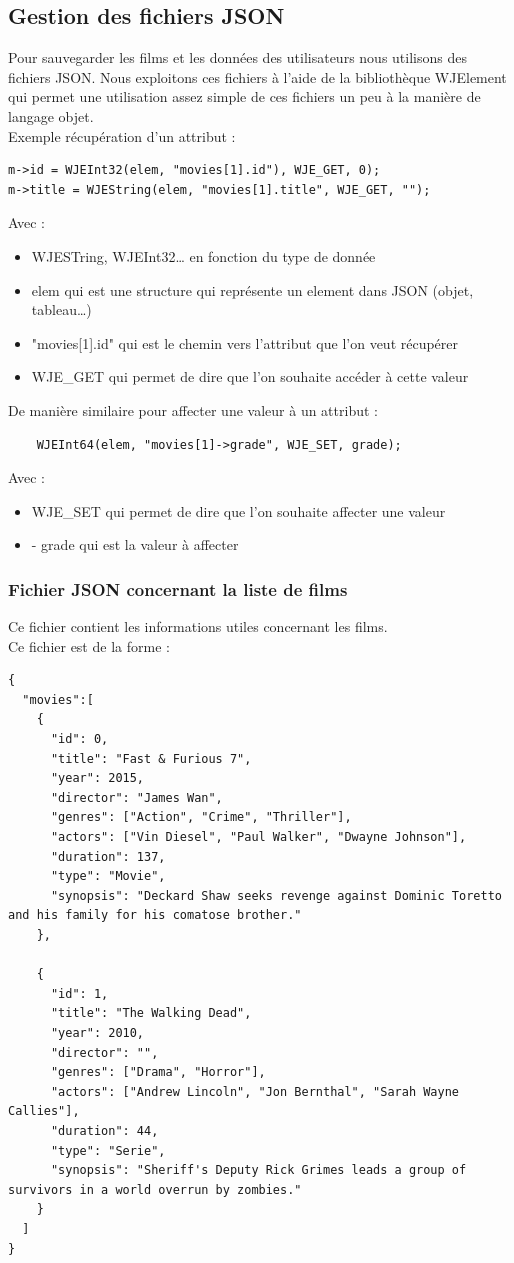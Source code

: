 \documentclass{article}
\begin{document}
\subsection{Gestion des fichiers JSON}
Pour sauvegarder les films et les données des utilisateurs nous utilisons des fichiers JSON. Nous exploitons ces fichiers à l’aide de la bibliothèque WJElement qui permet une utilisation assez simple de ces fichiers un peu à la manière de langage objet.\\
Exemple récupération d’un attribut :\\
\begin{verbatim}
m->id = WJEInt32(elem, "movies[1].id"), WJE_GET, 0);
m->title = WJEString(elem, "movies[1].title", WJE_GET, "");
\end{verbatim}
Avec :
\begin{itemize}
    \item WJESTring, WJEInt32… en fonction du type de donnée
    \item elem qui est une structure qui représente un element dans JSON (objet, tableau…)
    \item "movies[1].id" qui est le chemin vers l’attribut que l’on veut récupérer
    \item WJE\_GET qui permet de dire que l’on souhaite accéder à cette valeur
\end{itemize}
\vspace{3mm}

De manière similaire pour affecter une valeur à un attribut :

\begin{verbatim}
    WJEInt64(elem, "movies[1]->grade", WJE_SET, grade);
\end{verbatim}
Avec :
\begin{itemize}
    \item WJE\_SET qui permet de dire que l’on souhaite affecter une valeur
    \item -	grade qui est la valeur à affecter
\end{itemize}
\subsubsection{Fichier JSON concernant la liste de films}
Ce fichier contient les informations utiles concernant les films.\\
Ce fichier est de la forme :
\begin{verbatim}
{
  "movies":[
    {
      "id": 0,
      "title": "Fast & Furious 7",
      "year": 2015,
      "director": "James Wan",
      "genres": ["Action", "Crime", "Thriller"],
      "actors": ["Vin Diesel", "Paul Walker", "Dwayne Johnson"],
      "duration": 137,
      "type": "Movie",
      "synopsis": "Deckard Shaw seeks revenge against Dominic Toretto and his family for his comatose brother."
    },

    {
      "id": 1,
      "title": "The Walking Dead",
      "year": 2010,
      "director": "",
      "genres": ["Drama", "Horror"],
      "actors": ["Andrew Lincoln", "Jon Bernthal", "Sarah Wayne Callies"],
      "duration": 44,
      "type": "Serie",
      "synopsis": "Sheriff's Deputy Rick Grimes leads a group of survivors in a world overrun by zombies."
    }
  ]
}
\end{verbatim}
\end{document}
